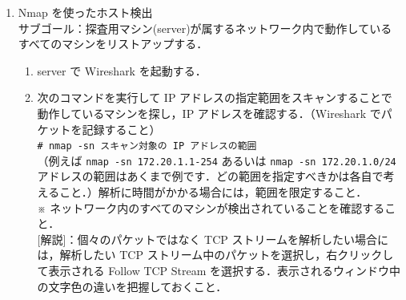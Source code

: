 \begin{enumerate}[label=(\arabic*.),leftmargin=*]
    \item Nmap を使ったホスト検出 \\
    サブゴール：探査用マシン(server)が属するネットワーク内で動作しているすべてのマシンをリストアップする．
    \begin{enumerate}[label=\arabic*, leftmargin=*]
        
        \item server で Wireshark を起動する．
        
        \item 次のコマンドを実行して IP アドレスの指定範囲をスキャンすることで動作しているマシンを探し，IP アドレスを確認する．（Wireshark でパケットを記録すること） \\
        \texttt{\# nmap -sn スキャン対象の IP アドレスの範囲} \\
        （例えば \texttt{nmap -sn 172.20.1.1-254} あるいは \texttt{nmap -sn 172.20.1.0/24} アドレスの範囲はあくまで例です．どの範囲を指定すべきかは各自で考えること．）解析に時間がかかる場合には，範囲を限定すること． \\
        ※ ネットワーク内のすべてのマシンが検出されていることを確認すること． \\
        \mbox{}[解説]：個々のパケットではなく TCP ストリームを解析したい場合には，解析したい TCP ストリーム中のパケットを選択し，右クリックして表示される Follow TCP Stream を選択する．表示されるウィンドウ中の文字色の違いを把握しておくこと．


\end{enumerate}
\end{enumerate}
